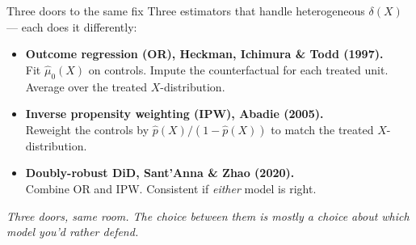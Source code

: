 \documentclass[aspectratio=169,11pt]{beamer}
\begin{document}
\begin{frame}{Three doors to the same fix}
\footnotesize
Three estimators that handle heterogeneous $\delta(X)$ --- each does it differently:

\vspace{0.6em}
\begin{itemize}\setlength\itemsep{4pt}
  \item \textbf{Outcome regression (OR), \;Heckman, Ichimura \& Todd (1997).} \\
        Fit $\widehat{\mu}_0(X)$ on controls. \;Impute the counterfactual for each treated unit. \;Average over the treated $X$-distribution. \;
  \item \textbf{Inverse propensity weighting (IPW), \;Abadie (2005).} \\
        Reweight the controls by $\widehat{p}(X)/(1-\widehat{p}(X))$ to match the treated $X$-distribution. \;
  \item \textbf{Doubly-robust DiD, \;Sant'Anna \& Zhao (2020).} \\
        Combine OR and IPW. \;Consistent if \textit{either} model is right. \;
\end{itemize}

\vspace{0.4em}
\begin{center}
\small\color{warmgray}\itshape
Three doors, same room. \;The choice between them is mostly a choice about which model you'd rather defend.
\end{center}
\end{frame}
\end{document}
